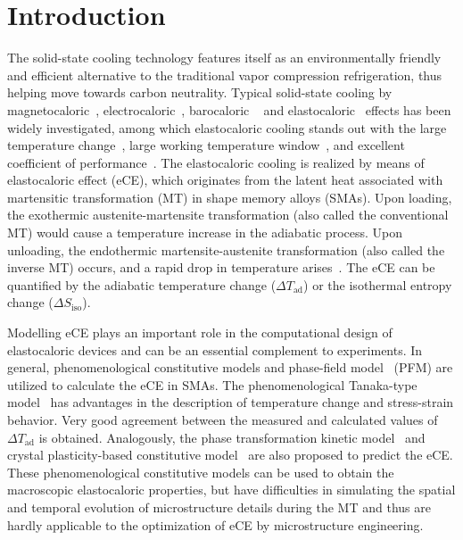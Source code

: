 \documentclass[reprint,3p,sort&compress,times,onecolumn]{elsarticle}
\begin{document}
\section{Introduction}
The solid-state cooling technology features itself as an environmentally friendly and efficient alternative to the traditional vapor compression refrigeration, thus helping move towards carbon neutrality.
Typical solid-state cooling by  magnetocaloric~\cite{wada2001giant,phan2007review,gschneidnerjr2005recent}, electrocaloric~\cite{mischenko2006giant,scott2011electrocaloric},
barocaloric
~\cite{manosa2010giant,lloveras2015giant} and elastocaloric~\cite{bonnot2008elastocaloric,tuvsek2015elastocaloricni,manosa2013large,tuvsek2015elastocaloric} effects has been widely investigated, among which elastocaloric cooling stands out with the large temperature change~\cite{tuvsek2015elastocaloricni,cui2012demonstration}, large working temperature window~\cite{manosa2013large}, and excellent coefficient of performance~\cite{ovzbolt2014electrocaloric,qian2016review}. The elastocaloric cooling is realized by means of elastocaloric effect (eCE), which originates from the latent heat associated with martensitic transformation (MT) in shape memory alloys (SMAs).
Upon loading, the exothermic austenite-martensite transformation (also called the conventional MT) would cause a temperature increase in the adiabatic process. Upon unloading, the endothermic martensite-austenite transformation (also called the inverse MT) occurs, and a rapid drop in temperature arises~\cite{bonnot2008elastocaloric}. 
The eCE can be quantified by the adiabatic temperature change ($\Delta T_{\text{ad}}$) or the isothermal entropy change ($\Delta S_{\text{iso}}$). 

Modelling eCE plays an important role in the computational design of elastocaloric devices and can be an essential complement to experiments.
In general, phenomenological constitutive models and phase-field model~\cite{chen2002phase,chen2022classical} (PFM) are utilized to calculate the eCE in SMAs.
The phenomenological Tanaka-type model~\cite{tanaka1986thermomechanical,ossmer2014evolution,krevet2013evolution,tuvsek2016understanding,tuvsek2015elastocaloric,luo2017modeling} has advantages in the description of temperature change and stress-strain behavior. 
Very good agreement between the measured and calculated values of $\Delta T_{\text{ad}}$ is obtained. Analogously, the phase transformation kinetic model~\cite{qian2015thermodynamics,qian2017mechanism,qian2017numerical}
and crystal plasticity-based constitutive model~\cite{yu2020modeling,zhou2020modeling} are also proposed to predict the eCE. These phenomenological constitutive models can be used to obtain the macroscopic elastocaloric properties, but have difficulties in simulating the spatial and temporal evolution of microstructure details during the MT and thus are hardly applicable to the optimization of eCE by microstructure engineering.
\end{document}

